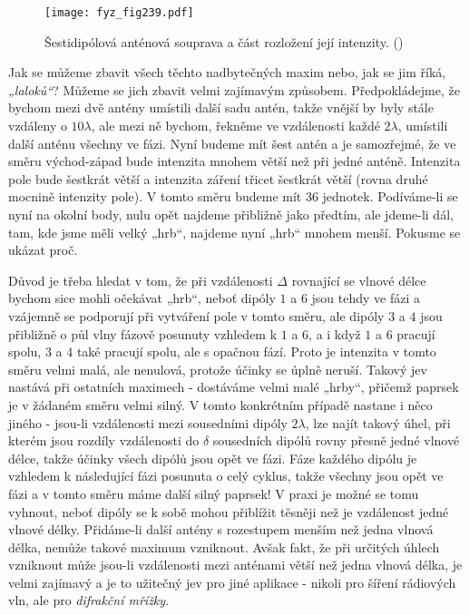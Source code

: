    \begin{figure}[ht!] %
      \centering
      \texttt{[image: fyz\_fig239.pdf]}
      \caption{Šestidipólová anténová souprava a část rozložení její intenzity. 
               (\cite[s.~385]{Feynman01})}
      \label{fyz:fig239}
    \end{figure}
    
    Jak se můžeme zbavit všech těchto nadbytečných maxim nebo, jak se jim říká, \emph{„laloků“}? 
    Můžeme se jich zbavit velmi zajímavým způsobem. Předpokládejme, že bychom mezi dvě antény 
    umístili další sadu antén, takže vnější by byly stále vzdáleny o \(10\lambda\), ale mezi ně 
    bychom, řekněme ve vzdálenosti každé \(2\lambda\), umístili další anténu všechny ve fázi. Nyní 
    budeme mít šest antén a je samozřejmé, že ve směru východ-západ bude intenzita mnohem větší než 
    při jedné anténě. Intenzita pole bude šestkrát větší a intenzita záření třicet šestkrát větší 
    (rovna druhé mocnině intenzity pole). V tomto směru budeme mít \(36\) jednotek. Podíváme-li se 
    nyní na okolní body, nulu opět najdeme přibližně jako předtím, ale jdeme-li dál, tam, kde jsme 
    měli velký „hrb“, najdeme nyní „hrb“ mnohem menší. Pokusme se ukázat proč.
    
    Důvod je třeba hledat v tom, že při vzdálenosti \(\Delta\) rovnající se vlnové délce bychom 
    sice mohli očekávat „hrb“, neboť dipóly \(1\) a \(6\) jsou tehdy ve fázi a vzájemně se 
    podporují při vytváření pole v tomto směru, ale dipóly \(3\) a \(4\) jsou přibližně o půl vlny 
    fázově posunuty vzhledem k \(1\) a \(6\), a i když \(1\) a \(6\) pracují spolu, \(3\) a \(4\) 
    také pracují spolu, ale s opačnou fází. Proto je intenzita v tomto směru velmi malá, ale 
    nenulová, protože účinky se úplně neruší. Takový jev nastává při ostatních maximech - dostáváme 
    velmi malé „hrby“, přičemž paprsek je v žádaném směru velmi silný. V tomto konkrétním případě 
    nastane i něco jiného - jsou-li vzdálenosti mezi sousedními dipóly \(2\lambda\), lze najít 
    takový úhel, při kterém jsou rozdíly vzdálenosti do \(\delta\) sousedních dipólů rovny přesně 
    jedné vlnové délce, takže účinky všech dipólů jsou opět ve fázi. Fáze každého dipólu je 
    vzhledem k následující fázi posunuta o celý cyklus, takže všechny jsou opět ve fázi a v tomto 
    směru máme další silný paprsek! V praxi je možné se tomu vyhnout, neboť dipóly se k sobě mohou 
    přiblížit těsněji než je vzdálenost jedné vlnové délky. Přidáme-li další antény s rozestupem 
    menším než jedna vlnová délka, nemůže takové maximum vzniknout. Avšak fakt, že při určitých 
    úhlech vzniknout může jsou-li vzdálenosti mezi anténami větší než jedna vlnová délka, je velmi 
    zajímavý a je to užitečný jev pro jiné aplikace - nikoli pro šíření rádiových vln, ale pro 
    \emph{difrakční mřížky}.
    
